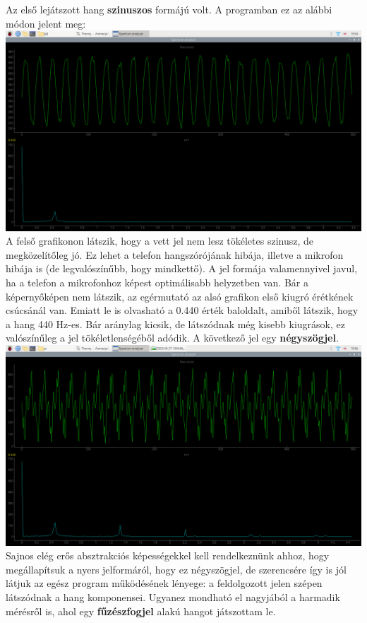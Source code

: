\documentclass[12pt,a4paper]{article}
\begin{document}
      Az első lejátszott hang \textbf{szinuszos} formájú volt. A programban ez az alábbi módon jelent meg:
      \includegraphics[width=\textwidth]{s_a_sin.png}
      A felső grafikonon látszik, hogy a vett jel nem lesz tökéletes szinusz, de megközelítőleg jó. Ez lehet a telefon hangszórójának hibája, illetve a mikrofon hibája is (de legvalószínűbb, hogy mindkettő). A jel formája valamennyivel javul, ha a telefon a mikrofonhoz képest optimálisabb helyzetben van. Bár a képernyőképen nem látszik, az egérmutató az alsó grafikon első kiugró érétkének csúcsánál van. Emiatt le is olvasható a 0.440 érték baloldalt, amiből látszik, hogy a hang 440 Hz-es. Bár aránylag kicsik, de látszódnak még kisebb kiugrások, ez valószínűleg a jel tökéletlenségéből adódik.
      A következő jel egy \textbf{négyszögjel}.
      \includegraphics[width=\textwidth]{s_a_square.png}
      Sajnos elég erős absztrakciós képességekkel kell rendelkeznünk ahhoz, hogy megállapítsuk a nyers jelformáról, hogy ez négyszögjel, de szerencsére így is jól látjuk az egész program működésének lényege: a feldolgozott jelen szépen látszódnak a hang komponensei.
      Ugyanez mondható el nagyjából a harmadik mérésről is, ahol egy \textbf{fűzészfogjel} alakú hangot játszottam le.
\end{document}
